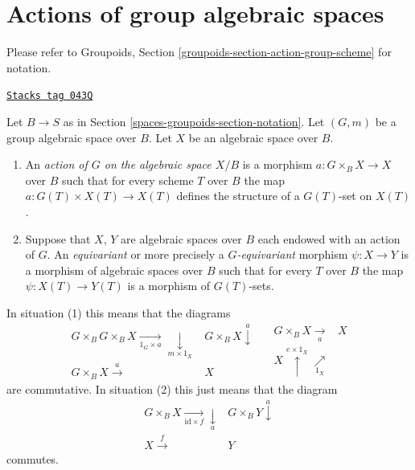 \section{Actions of group algebraic spaces}
\label{spaces-groupoids-section-action-group-space}
Please refer to
Groupoids, Section \ref{groupoids-section-action-group-scheme}
for notation.

\begin{definition}
\label{spaces-groupoids-definition-action-group-space}
\href{https://stacks.math.columbia.edu/tag/043Q}{\texttt{Stacks tag 043Q}}

Let $B \to S$ as in Section \ref{spaces-groupoids-section-notation}.
Let $(G, m)$ be a group algebraic space over $B$.
Let $X$ be an algebraic space over $B$.
\begin{enumerate}
\item An {\it action of $G$ on the algebraic space $X/B$} is
a morphism $a : G \times_B X \to X$ over $B$ such that
for every scheme $T$ over $B$ the map $a : G(T) \times X(T) \to X(T)$
defines the structure of a $G(T)$-set on $X(T)$.
\item Suppose that $X$, $Y$ are algebraic spaces over $B$ each endowed
with an action of $G$. An {\it equivariant} or more precisely
a {\it $G$-equivariant} morphism $\psi : X \to Y$
is a morphism of algebraic spaces over $B$ such
that for every $T$ over $B$ the map $\psi : X(T) \to Y(T)$ is
a morphism of $G(T)$-sets.
\end{enumerate}
\end{definition}

In situation (1) this means that the diagrams
\begin{equation}
\label{equation-action}
\begin{array}{cc}G \times_B G \times_B X \underset{1_G \times a}{\longrightarrow}\underset{m \times 1_X}{\downarrow} & G \times_B X \overset{a}{\downarrow} \\ G \times_B X \overset{a}{\longrightarrow} & X\end{array}
\quad
\begin{array}{cc}G \times_B X \underset{a}{\longrightarrow} & X \\ X\overset{e \times 1_X}{\uparrow}\underset{1_X}{\nearrow} & \end{array}
\end{equation}
are commutative. In situation (2) this just means that the diagram
$$
\begin{array}{cc}G \times_B X \underset{\text{id} \times f}{\longrightarrow}\underset{a}{\downarrow} & G \times_B Y \overset{a}{\downarrow} \\ X \overset{f}{\longrightarrow} & Y\end{array}
$$
commutes.

